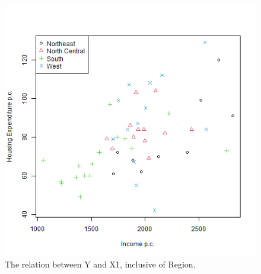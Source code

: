 \documentclass[12pt,letterpaper]{article}
\begin{document}
\begin{figure}[h!]\centering
	\caption{\footnotesize The relation between Y and X1, inclusive of Region.}
	\label{fig:plot_8}
	\includegraphics[width=1\textwidth]{Y_X1_Region.png}
\end{figure}
\end{document}
